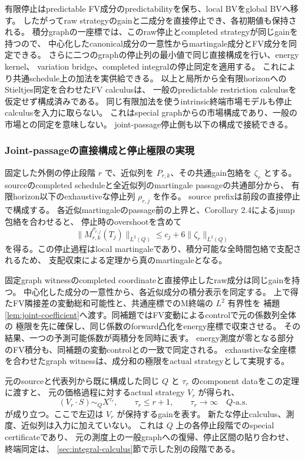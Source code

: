 有限停止はpredictable FV成分のpredictabilityを保ち、local BVをglobal BVへ移す。
したがってraw strategyのgainと二成分を直接停止でき、各初期値も保持される。
積分graphの一座標では、このraw停止とcompleted strategyが同じgainを持つので、
中心化したcanonical成分の一意性からmartingale成分とFV成分を同定できる。
さらに二つのgraphの停止列の最小値で同じ直接構成を行い、energy kernel、
variation bridge、completed integralの停止同定を適用する。
これにより共通schedule上の加法を実供給できる。
以上と局所から全有限horizonへのStieltjes同定を合わせたFV calculusは、
一般のpredictable restriction calculusを仮定せず構成済みである。
同じ有限加法を使うintrinsic終端市場モデルも停止calculusを入力に取らない。
これはspecial graphからの市場構成であり、一般の市場との同定を意味しない。
joint-passage停止側も以下の構成で接続できる。


\subsubsection{Joint-passageの直接構成と停止極限の実現}\label{sec:joint-realization}
固定した外側の停止段階 $r$ で、近似列を $P_{r,k}$、その共通gain包絡を $\zeta_r$ とする。
sourceのcompleted scheduleと全近似列のmartingale passageの共通部分から、
有限horizon以下のexhaustiveな停止列 $\rho_{r,j}$ を作る。
source prefixは前段の直接停止で構成する。
各近似martingaleのpassage前の上界と、Corollary 2.4によるjump包絡を合わせると、
停止時のovershootを含めて
\[
 \|M_{r,k}^{\rho_{r,j}}(T_j)\|_{L^2(Q)}
 \le c_j+6\|\zeta_r\|_{L^2(Q)}
\]
を得る。この停止過程はlocal martingaleであり、積分可能な全時間包絡で支配されるため、
支配収束による定理から真のmartingaleとなる。

固定graph witnessのcompleted coordinateと直接停止したraw成分は同じgainを持つ。
中心化した成分の一意性から、各近似成分の積分表示を同定する。
上で得たFV隣接差の変動総和可能性と、共通座標でのM終端の $L^2$ 有界性を
補題\ref{lem:joint-coefficient}へ渡す。同補題ではFV変動によるcontrolで元の係数列全体の
極限を先に確保し、同じ係数のforward凸化をenergy座標で収束させる。
その結果、一つの予測可能係数が両積分を同時に表す。
energy測度が零となる部分のFV積分も、同補題の変動controlとの一致で同定される。
exhaustiveな全座標を合わせたgraph witnessは、成分和の極限をactual strategyとして実現する。

元のsourceと代表列から既に構成した同じ $Q$ と $\tau_r$ のcomponent dataをこの定理に渡すと、
元の価格過程に対するactual strategy $V_r$ が得られ、
\[
 (V_r\cdot S)\sim_Q X^{\tau_r},\qquad
 \tau_r\le r+1,\qquad \tau_r\longrightarrow\infty
 \quad Q\text{-a.s.}
\]
が成り立つ。ここで左辺は $V_r$ が保持するgainを表す。
新たな停止calculus、測度、近似列は入力に加えていない。
これは $Q$ 上の各停止段階でのspecial certificateであり、
元の測度上の一般graphへの復帰、停止区間の貼り合わせ、終端同定は、
\ref{sec:integral-calculus}節で示した別の段階である。
